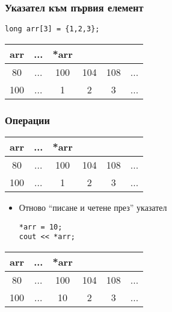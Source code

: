 \documentclass{beamer}
\begin{document}
\begin{frame}[fragile]
\frametitle{Указател към първия елемент}


\begin{flushleft}
\begin{lstlisting}
long arr[3] = {1,2,3};
\end{lstlisting}
\end{flushleft}

\pause

\begin{tabular} {c | c | c | c | c | c }

arr &... &*arr \\\hline
80  &... & 100 & 104 & 108 &... \\\hline
100 &... & 1   & 2   & 3   &... \\\hline
  
\end{tabular}

\end{frame}




\begin{frame}[fragile]
\frametitle{Операции}


\begin{tabular} {c | c | c | c | c | c }

arr &... &*arr \\\hline
80  &... & 100 & 104 & 108 &... \\\hline
100 &... & 1   & 2   & 3   &... \\\hline
  
\end{tabular}


\begin{itemize}
  \item Отново ``писане и четене през'' указател
\begin{flushleft}
\begin{lstlisting}
*arr = 10;
cout << *arr;
\end{lstlisting}
\end{flushleft}

\end{itemize}

\pause
\begin{tabular} {c | c | c | c | c | c }

arr &... &*arr \\\hline
80  &... & 100 & 104 & 108 &... \\\hline
100 &... & \alert{10}   & 2   & 3   &... \\\hline
  
\end{tabular}

\end{frame}
\end{document}
